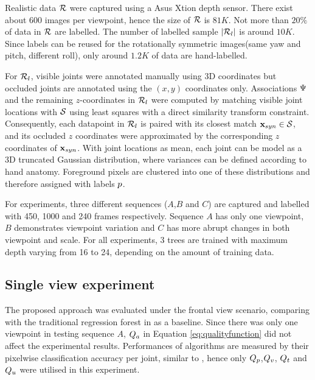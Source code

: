 Realistic data $\mathcal{R}$ were captured using a Asus Xtion depth sensor. There exist about $600$ images per viewpoint, hence the size of $\mathcal{R}$ is $81K$. Not more than $20\%$ of data in $\mathcal{R}$ are labelled. The number of labelled sample $|\mathcal{R}_{l}|$ is around $10K$. Since labels can be reused for the rotationally symmetric images(same yaw and pitch, different roll), only around $1.2K$ of data are hand-labelled.    

For $\mathcal{R}_{l}$, visible joints were annotated manually using 3D coordinates but occluded joints are annotated using the $(x,y)$ coordinates only. 
Associations $\mathrm{\Psi}$ and the remaining $z$-coordinates in $\mathcal{R}_{l}$ were computed by matching visible joint locations with $\mathcal{S}$ using least squares with a direct similarity transform constraint. Consequently, each datapoint in $\mathcal{R}_{l}$ is paired with its closest match $\mathbf{x}_{syn} \in \mathcal{S}$, and its occluded $z$ coordinates were approximated by the corresponding $z$ coordinates of $\mathbf{x}_{syn}$.
With joint locations as mean, each joint can be model as a 3D truncated Gaussian distribution, where variances can be defined according to hand anatomy. Foreground pixels are clustered into one of these distributions and therefore assigned with labels $p$.

For experiments, three different sequences ($A$,$B$ and $C$) are captured and labelled with 450, 1000 and 240 frames respectively. Sequence $A$ has only one viewpoint, $B$ demonstrates viewpoint variation and $C$ has more abrupt changes in both viewpoint and scale. For all experiments, 3 trees are trained with maximum depth varying from 16 to 24, depending on the amount of training data.




\subsection{Single view experiment} 

The proposed approach was evaluated under the frontal view scenario, comparing with the traditional regression forest in \cite{Gall2011} as a baseline. Since there was only one viewpoint in testing sequence $A$,  $Q_{a}$ in Equation \ref{eq:qualityfunction} did not affect the experimental results.  
Performances of algorithms are measured by their pixelwise classification accuracy per joint, similar to \cite{Shotton2011}, hence only $Q_{p}$,$Q_{v}$, $Q_{t}$ and $Q_{u}$ were utilised in this experiment.    

